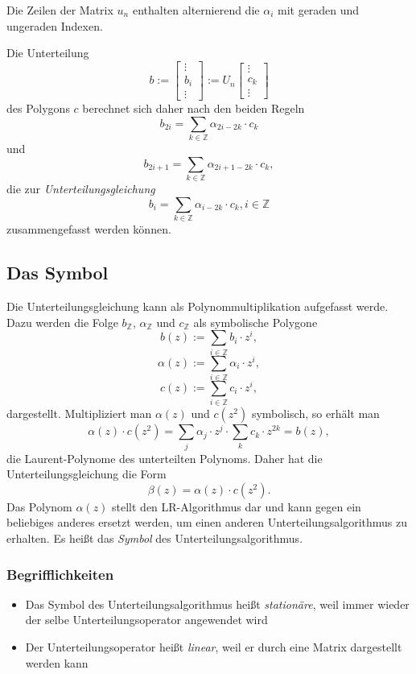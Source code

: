 Die Zeilen der Matrix \(u_n\) enthalten alternierend die \(\alpha_i\) mit geraden und ungeraden Indexen.

Die Unterteilung
\[b:= \begin{bmatrix} \vdots \\ b_i \\ \vdots \end{bmatrix} := U_n \begin{bmatrix} \vdots \\ c_k \\ \vdots \end{bmatrix}\]
des Polygons \(c\) berechnet sich daher nach den beiden Regeln
\[b_{2i} = \sum_{k\in \mathbb{Z}} \alpha_{2i-2k}\cdot c_k\]
und
\[b_{2i+1} = \sum_{k\in \mathbb{Z}} \alpha_{2i+1-2k}\cdot c_k,\]
die zur \textit{Unterteilungsgleichung}
\[b_i = \sum_{k\in \mathbb{Z}} \alpha_{i-2k}\cdot c_k, i \in \mathbb{Z}\]
zusammengefasst werden können.


\subsection{Das Symbol}
Die Unterteilungsgleichung kann als Polynommultiplikation aufgefasst werde. Dazu werden die Folge \(b_{\mathbb{Z}}\), \(\alpha_{\mathbb{Z}}\) und \(c_{\mathbb{Z}}\) als symbolische Polygone
\[b(z) := \sum_{i \in \mathbb{Z}} b_i \cdot z^i,\]
\[\alpha(z) := \sum_{i \in \mathbb{Z}} \alpha_i \cdot z^i,\]
\[c(z) := \sum_{i \in \mathbb{Z}} c_i \cdot z^i,\]
dargestellt. Multipliziert man \(\alpha(z)\) und \(c(z^2)\) symbolisch, so erhält man
\[\alpha(z) \cdot c(z^2) = \sum_j \alpha_j\cdot z^j \cdot \sum_k c_k\cdot z^{2k} = b(z),\]
die Laurent-Polynome des unterteilten Polynoms. Daher hat die Unterteilungsgleichung die Form
\[\beta(z) = \alpha(z)\cdot c(z^2).\]
Das Polynom \(\alpha(z)\) stellt den LR-Algorithmus dar und kann gegen ein beliebiges anderes ersetzt werden, um einen anderen Unterteilungsalgorithmus zu erhalten. Es heißt das \textit{Symbol} des Unterteilungsalgorithmus.

\subsubsection{Begrifflichkeiten}
\begin{itemize}
	\item Das Symbol des Unterteilungsalgorithmus heißt \textit{stationäre}, weil immer wieder der selbe Unterteilungsoperator angewendet wird
	\item Der Unterteilungsoperator heißt \textit{linear}, weil er durch eine Matrix dargestellt werden kann
\end{itemize}


